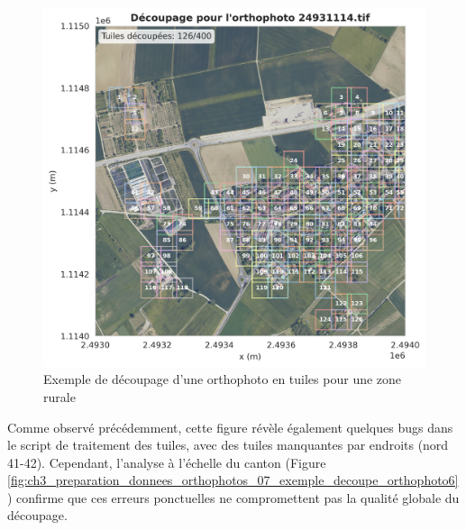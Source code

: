 \begin{figure}[H]
    \centering
    \includegraphics[width=1\linewidth]{02-main/figures/ch3/ch3_preparation_donnees_orthophotos_05_exemple_decoupe_orthophoto4.png}
    \caption{Exemple de découpage d'une orthophoto en tuiles pour une zone rurale}
    \label{fig:ch3_preparation_donnees_orthophotos_05_exemple_decoupe_orthophoto4}
\end{figure}

Comme observé précédemment, cette figure révèle également quelques bugs dans le script de traitement des tuiles, avec des tuiles manquantes par endroits (nord 41-42). Cependant, l'analyse à l'échelle du canton (Figure \ref{fig:ch3_preparation_donnees_orthophotos_07_exemple_decoupe_orthophoto6}) confirme que ces erreurs ponctuelles ne compromettent pas la qualité globale du découpage.

